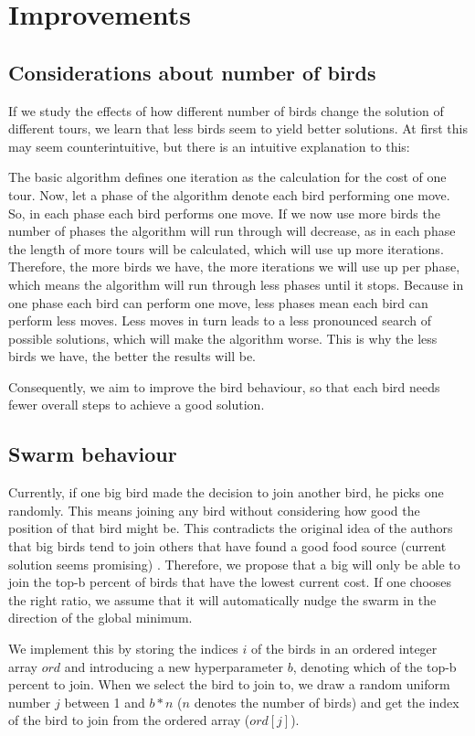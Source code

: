 \section{Improvements} \label{Improvements}
\subsection{Considerations about number of birds}
If we study the effects of how different number of birds change the solution of different tours, we learn that less birds seem to yield better solutions. At first this may seem counterintuitive, but there is an intuitive explanation to this:

The basic algorithm defines one iteration as the calculation for the cost of one tour. Now, let a phase of the algorithm denote each bird performing one move. So, in each phase each bird performs one move.
If we now use more birds the number of phases the algorithm will run through will decrease, as in each phase the length of more tours will be calculated, which will use up more iterations. Therefore, the more birds we have, the more iterations we will use up per phase, which means the algorithm will run through less phases until it stops. 
Because in one phase each bird can perform one move, less phases mean each bird can perform less moves. Less moves in turn leads to a less pronounced search of possible solutions, which will make the algorithm worse. This is why the less birds we have, the better the results will be.

Consequently, we aim to improve the bird behaviour, so that each bird needs fewer overall steps to achieve a good solution.

\subsection{Swarm behaviour}
Currently, if one big bird made the decision to join another bird, he picks one randomly.
This means joining any bird without considering how good the position of that bird might be. This contradicts the original idea of the authors that big birds tend to join others that have found a good food source (current solution seems promising) \cite{afb}.
Therefore, we propose that a big will only be able to join the top-b percent of birds that have the lowest current cost. If one chooses the right ratio, we assume that it will automatically nudge the swarm in the direction of the global minimum.

We implement this by storing the indices $i$ of the birds in an ordered integer array $ord$ and introducing a new hyperparameter $b$, denoting which of the top-b percent to join. When we select the bird to join to, we draw a random uniform number $j$ between 1 and $b*n$ ($n$ denotes the number of birds) and get the index of the bird to join from the ordered array ($ord[j]$).

